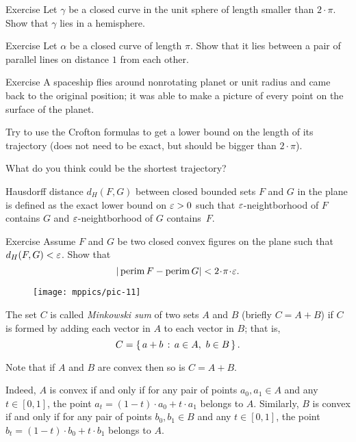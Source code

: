 \begin{thm}{Exercise} 
Let $\gamma$ be a closed curve in the unit sphere of length smaller than $2\cdot\pi$.
Show that $\gamma$ lies in a hemisphere.
\end{thm}

\begin{thm}{Exercise} 
Let $\alpha$ be a closed curve of length $\pi$.
Show that it lies between a pair of parallel lines on distance $1$ from each other.
\end{thm}

\begin{thm}{Exercise}
A spaceship flies around nonrotating planet or unit radius and came back to the original position;
it was able to make a picture of every point on the surface of the planet.

Try to use the Crofton formulas to get a lower bound on the length of its trajectory (does not need to be exact, but should be bigger than $2\cdot\pi$).

What do you think could be the shortest trajectory?
\end{thm}

Hausdorff distance $d_H(F,G)$ between closed bounded sets $F$ and $G$ in the plane is defined as the exact lower bound on $\varepsilon>0$ such that $\varepsilon$-neightborhood of $F$ contains $G$ and $\varepsilon$-neightborhood of $G$ contains~$F$.

\begin{thm}{Exercise}
Assume $F$ and $G$ be two closed convex figures on the plane such that $d_H(F,G)<\varepsilon$.
Show that 
\[|\perim F-\perim G|<2\cdot\pi\cdot\eps.\]

\end{thm}

\begin{wrapfigure}{r}{33 mm}
\vskip-5mm
\centering
\texttt{[image: mppics/pic-11]}
\end{wrapfigure}

The set $C$ is called \emph{Minkowski sum} of two sets $A$ and $B$  (briefly $C=A+B$) if $C$ is formed by adding each vector in $A$ to each vector in $B$;
that is, 
\[C = \left\{\,{a+b}\,:\,{a\in A,\ b\in B}\,\right\}.\]

Note that if $A$ and $B$ are convex then so is $C=A+B$. %

Indeed, $A$ is convex if and only if for any pair of points $a_0,a_1\in A$ and any $t\in[0,1]$,
the point $a_t=(1-t)\cdot a_0+t\cdot a_1$ belongs to $A$.
Similarly, $B$ is convex if and only if for any pair of points $b_0,b_1\in B$ and any $t\in[0,1]$,
the point $b_t=(1-t)\cdot b_0+t\cdot b_1$ belongs to $A$.

